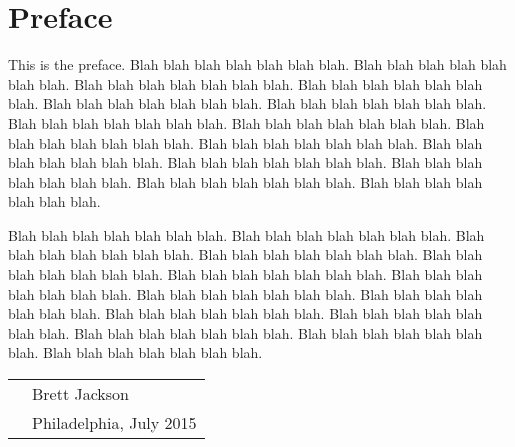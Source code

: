 
\chapter*{Preface}


This is the preface.  Blah blah blah blah blah blah blah.
Blah blah blah blah blah blah blah.  Blah blah blah blah blah blah blah.
Blah blah blah blah blah blah blah.  Blah blah blah blah blah blah blah.
Blah blah blah blah blah blah blah.  Blah blah blah blah blah blah blah.
Blah blah blah blah blah blah blah.  Blah blah blah blah blah blah blah.
Blah blah blah blah blah blah blah.  Blah blah blah blah blah blah blah.
Blah blah blah blah blah blah blah.  Blah blah blah blah blah blah blah.
Blah blah blah blah blah blah blah.  Blah blah blah blah blah blah blah.

Blah blah blah blah blah blah blah.  Blah blah blah blah blah blah blah.
Blah blah blah blah blah blah blah.  Blah blah blah blah blah blah blah.
Blah blah blah blah blah blah blah.  Blah blah blah blah blah blah blah.
Blah blah blah blah blah blah blah.  Blah blah blah blah blah blah blah.
Blah blah blah blah blah blah blah.  Blah blah blah blah blah blah blah.
Blah blah blah blah blah blah blah.  Blah blah blah blah blah blah blah.
Blah blah blah blah blah blah blah.  Blah blah blah blah blah blah blah.

\vspace{0.05\textheight}

\begin{tabular}{p{} l}
  & Brett Jackson         \\
  & Philadelphia, July 2015   \\
\end{tabular}

